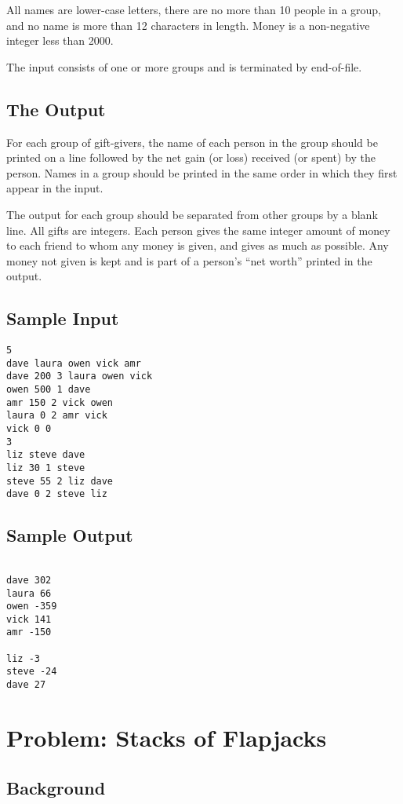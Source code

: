 All names are lower-case letters, there are no more than 10 people in a
group, and no name is more than 12 characters in length.  Money is a
non-negative integer less than 2000.

The input consists of one or more groups and is terminated by end-of-file.

\subsection*{The Output}

For each group of gift-givers, the name of each person in the group
should be printed on a line followed by the net gain (or loss) received
(or spent) by the person.  Names in a group should be printed in the
same order in which they first appear in the input.  

The output for each group should be separated from other groups by a
blank line.  All gifts are integers.  Each person gives the same integer
amount of money to each friend to whom any money is given, and gives as
much as possible.  Any money not given is kept and is part of a person's
``net worth'' printed in the output.

\clearpage
\subsection*{Sample Input}
\begin{verbatim}
5
dave laura owen vick amr
dave 200 3 laura owen vick
owen 500 1 dave
amr 150 2 vick owen
laura 0 2 amr vick
vick 0 0
3
liz steve dave
liz 30 1 steve
steve 55 2 liz dave
dave 0 2 steve liz
\end{verbatim}


\subsection*{Sample Output}
\begin{verbatim}

dave 302
laura 66
owen -359
vick 141
amr -150

liz -3
steve -24
dave 27
\end{verbatim}

\clearpage

\section{Problem: Stacks of Flapjacks}

\subsection*{Background}

